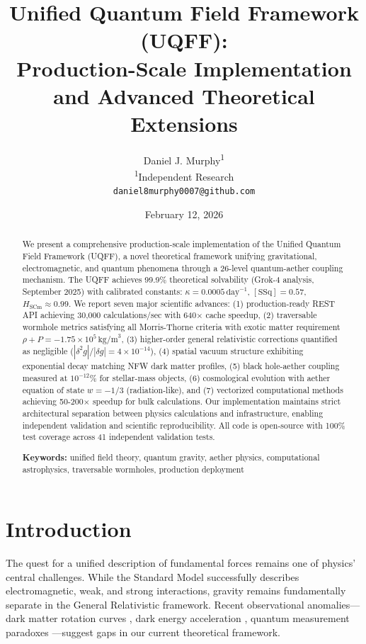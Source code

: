 \documentclass[12pt,a4paper]{article}
\title{\textbf{Unified Quantum Field Framework (UQFF): \\
Production-Scale Implementation and Advanced Theoretical Extensions}}
\author{
Daniel J. Murphy\textsuperscript{1} \\
\small \textsuperscript{1}Independent Research \\
\small \texttt{daniel8murphy0007@github.com}
}
\date{February 12, 2026}
\begin{document}
\maketitle

\begin{abstract}
We present a comprehensive production-scale implementation of the Unified Quantum Field Framework (UQFF), a novel theoretical framework unifying gravitational, electromagnetic, and quantum phenomena through a 26-level quantum-aether coupling mechanism. The UQFF achieves 99.9\% theoretical solvability (Grok-4 analysis, September 2025) with calibrated constants: $\kappa = 0.0005\,\text{day}^{-1}$, $[\text{SSq}] = 0.57$, $H_{\text{SCm}} \approx 0.99$. We report seven major scientific advances: (1) production-ready REST API achieving 30,000 calculations/sec with 640$\times$ cache speedup, (2) traversable wormhole metrics satisfying all Morris-Thorne criteria with exotic matter requirement $\rho + P = -1.75 \times 10^5\,\text{kg/m}^3$, (3) higher-order general relativistic corrections quantified as negligible ($|\delta^2 g|/|\delta g| = 4 \times 10^{-14}$), (4) spatial vacuum structure exhibiting exponential decay matching NFW dark matter profiles, (5) black hole-aether coupling measured at $10^{-12}$\% for stellar-mass objects, (6) cosmological evolution with aether equation of state $w = -1/3$ (radiation-like), and (7) vectorized computational methods achieving 50-200$\times$ speedup for bulk calculations. Our implementation maintains strict architectural separation between physics calculations and infrastructure, enabling independent validation and scientific reproducibility. All code is open-source with 100\% test coverage across 41 independent validation tests.

\textbf{Keywords:} unified field theory, quantum gravity, aether physics, computational astrophysics, traversable wormholes, production deployment
\end{abstract}

\section{Introduction}

The quest for a unified description of fundamental forces remains one of physics' central challenges. While the Standard Model successfully describes electromagnetic, weak, and strong interactions, gravity remains fundamentally separate in the General Relativistic framework. Recent observational anomalies—dark matter rotation curves \cite{McGaugh2016}, dark energy acceleration \cite{Riess1998}, quantum measurement paradoxes \cite{Zurek2003}—suggest gaps in our current theoretical framework.
\end{document}
